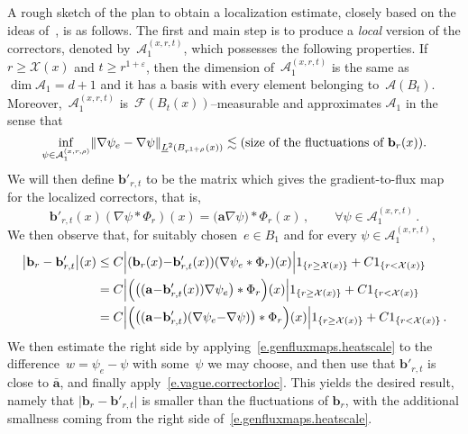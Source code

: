\documentclass[11pt]{article} %
\numberwithin{equation}{section}
\theoremstyle{definition}
\let\originalleft\left
\let\originalright\right
\renewcommand{\left}{\mathopen{}\mathclose\bgroup\originalleft}
\renewcommand{\right}{\aftergroup\egroup\originalright}
\newcommand{\eps}{\varepsilon}
\renewcommand{\b}{\ensuremath{\mathbf{b}}}
\newcommand{\ep}{\eps}
\renewcommand{\a}{\mathbf{a}}
\newcommand{\ahom}{\bar{\a}}
\newcommand{\F}{\mathcal{F}}
\newcommand{\X}{\mathcal{X}}
\newcommand{\indc}{1}
\newcommand{\A}{\mathcal{A}}
\begin{document}
A rough sketch of the plan to obtain a localization estimate, closely based on the ideas of~\cite[Section 4.4]{AKMBook}, is as follows. The first and main step is to produce a \emph{local} version of the correctors, denoted by~$\mathcal{A}_1^{(x,r,t)}$, which possesses the following properties. If~$r \geq \X(x)$ and $t\geq r^{1+\ep}$, then the dimension of~$\mathcal{A}_1^{(x,r,t)}$ is the same as $\dim \A_1=d+1$ and it has a basis with every element belonging to~$\A(B_{t})$. Moreover,~$\mathcal{A}_1^{(x,r,t)}$ is~$\F(B_t(x))$--measurable and  approximates $\A_1$ in the sense that 
\begin{equation}
\label{e.vague.correctorloc}
\inf_{\psi \in  \mathcal{A}_1^{(x,r,\rho)}} \left\| \nabla \psi_{e} - \nabla \psi \right\|_{\underline{L}^2(B_{r^{1+\rho}}(x))} 
\lesssim \text{(size of the fluctuations of $\b_r(x)$).}
\end{equation}
We will then define $\b'_{r,t}$ to be the matrix which gives the gradient-to-flux map for the localized correctors, that is,
\begin{equation}
\label{e.local.coarsened}
\b'_{r,t} (x) (\nabla \psi   \ast \Phi_{r} )(x)
=
\bigl( \a \nabla \psi   \bigr)  \ast \Phi_{r}(x)
\,, 
\qquad 
\forall \psi \in \mathcal{A}_1^{(x,r,t)}\,.
\end{equation}
We then observe that, for suitably chosen~$e\in B_1$ and for every $\psi \in \mathcal{A}_1^{(x,r,t)}$, 
\begin{align}
\label{e.localmagic}
\big| \b_r - \b'_{r,t} \big| (x) 
& 
\leq 
C
\Big| ( \b_r(x) {-} \b'_{r,t}(x)  )
(\nabla \psi_e  \ast \Phi_{r}) (x) \Big| \indc_{\{r \geq \X(x)\}} + C \indc_{\{r < \X(x)\}} 
\notag \\ & 
= 
C \Bigl| \Bigl(   \bigl(  ( \a {-} \b'_{r,t}(x) ) \nabla \psi_e \bigr) \ast \Phi_{r}  \Bigr) (x) \Bigr| \indc_{\{r \geq \X(x)\}} 
+ C \indc_{\{r < \X(x)\}}  
\notag \\ & 
=
C \Bigl| 
\Bigl(  \bigl( ( \a {-} \b'_{r,t}) ( \nabla \psi_{e} {-} \nabla \psi )\bigr) \ast \Phi_{r}  \Bigr)  (x) \Bigr|  \indc_{\{r \geq \X(x)\}} 
 + C \indc_{\{r < \X(x)\}} 
\,.
\end{align}
We then estimate the right side by applying~\eqref{e.genfluxmaps.heatscale} to the difference~$w=\psi_e - \psi$ with some~$\psi$ we may choose, and then use that $\b'_{r,t}$ is close to $\ahom$, and finally apply~\eqref{e.vague.correctorloc}. This yields the desired result, namely that $\big| \b_r - \b'_{r,t} \big|$ is smaller than the fluctuations of $\b_r$, with the additional smallness coming from the right side of~\eqref{e.genfluxmaps.heatscale}. 
\end{document}
